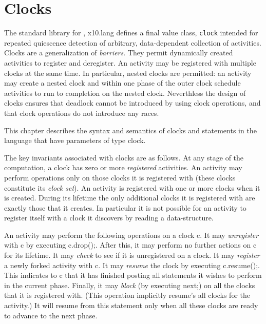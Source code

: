 \chapter{Clocks}\label{XtenClocks}
\cbstart
The standard library for \Xten{}, {\cf x10.lang} defines a {\cf final
value class}, {\tt clock} intended for repeated quiescence detection
of arbitrary, data-dependent collection of activities. Clocks are a
generalization of {\em barriers}. They permit dynamically created
activities to register and deregister. An activity may be registered
with multiple clocks at the same time. In particular, nested clocks
are permitted: an activity may create a nested clock and within one
phase of the outer clock schedule activities to run to completion on
the nested clock.  Neverthless the design of clocks ensures that
deadlock cannot be introduced by using clock operations, and that
clock operations do not introduce any races.

This chapter describes the syntax and semantics of clocks and
statements in the language that have parameters of type {\cf clock}. 

The key invariants associated with clocks are as follows.  At any
stage of the computation, a clock has zero or more {\em registered}
activities. An activity may perform operations only on those clocks it
is registered with (these clocks constitute its {\em clock set}).  An
activity is registered with one or more clocks when it is created.
During its lifetime the only additional clocks it is registered with
are exactly those that it creates. In particular it is not possible
for an activity to register itself with a clock it discovers by
reading a data-structure.

An activity may perform the following operations on a clock {\cf
c}. It may {\em unregister} with {\cf c} by executing {\cf
c.drop();}. After this, it may perform no further actions on {\cf c}
for its lifetime. It may {\em check} to see if it is unregistered on a
clock. It may {\em register} a newly forked activity with {\cf c}.
It may {\em resume} the clock by executing {\cf c.resume();}. This
indicates to {\cf c} that it has finished posting all statements it
wishes to perform in the current phase. Finally, it may {\em block}
(by executing {\cf next;}) on all the clocks that it is registered
with. (This operation implicitly {\cf resume}'s all clocks for the
activity.) It will resume from this statement only when all these
clocks are ready to advance to the next phase.

